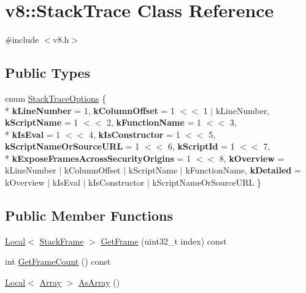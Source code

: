 \hypertarget{classv8_1_1StackTrace}{}\section{v8\+:\+:Stack\+Trace Class Reference}
\label{classv8_1_1StackTrace}


{\ttfamily \#include $<$v8.\+h$>$}

\subsection*{Public Types}
\begin{DoxyCompactItemize}
\item 
enum \hyperlink{classv8_1_1StackTrace_a9704e4a37949eb8eb8ccddbddf161492}{Stack\+Trace\+Options} \{ \\*
{\bfseries k\+Line\+Number} = 1, 
{\bfseries k\+Column\+Offset} = 1 $<$$<$ 1 $\vert$ k\+Line\+Number, 
{\bfseries k\+Script\+Name} = 1 $<$$<$ 2, 
{\bfseries k\+Function\+Name} = 1 $<$$<$ 3, 
\\*
{\bfseries k\+Is\+Eval} = 1 $<$$<$ 4, 
{\bfseries k\+Is\+Constructor} = 1 $<$$<$ 5, 
{\bfseries k\+Script\+Name\+Or\+Source\+U\+R\+L} = 1 $<$$<$ 6, 
{\bfseries k\+Script\+Id} = 1 $<$$<$ 7, 
\\*
{\bfseries k\+Expose\+Frames\+Across\+Security\+Origins} = 1 $<$$<$ 8, 
{\bfseries k\+Overview} = k\+Line\+Number $\vert$ k\+Column\+Offset $\vert$ k\+Script\+Name $\vert$ k\+Function\+Name, 
{\bfseries k\+Detailed} = k\+Overview $\vert$ k\+Is\+Eval $\vert$ k\+Is\+Constructor $\vert$ k\+Script\+Name\+Or\+Source\+U\+R\+L
 \}
\end{DoxyCompactItemize}
\subsection*{Public Member Functions}
\begin{DoxyCompactItemize}
\item 
\hyperlink{classv8_1_1Local}{Local}$<$ \hyperlink{classv8_1_1StackFrame}{Stack\+Frame} $>$ \hyperlink{classv8_1_1StackTrace_a6fd5ba809b5d87032d70d32f0b1a80e8}{Get\+Frame} (uint32\+\_\+t index) const 
\item 
int \hyperlink{classv8_1_1StackTrace_aafafebce6c034f1f6f4a870e8f52431e}{Get\+Frame\+Count} () const 
\item 
\hyperlink{classv8_1_1Local}{Local}$<$ \hyperlink{classv8_1_1Array}{Array} $>$ \hyperlink{classv8_1_1StackTrace_abd36f712b3ab986b572aa259b06bf5bd}{As\+Array} ()
\end{DoxyCompactItemize}
